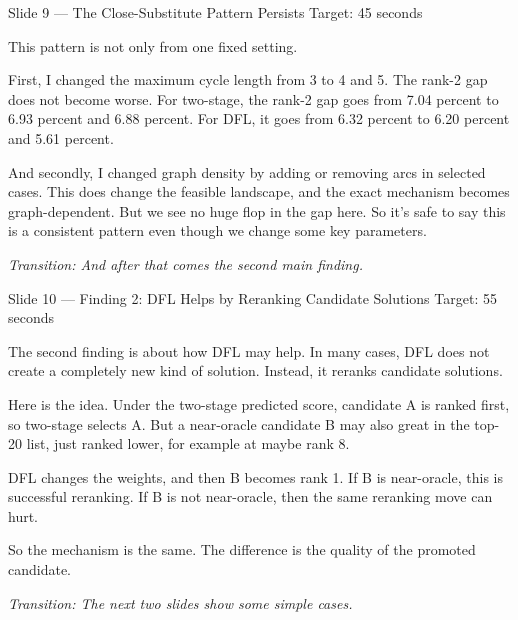 \documentclass[11pt,aspectratio=169]{beamer}
\newcommand{\tr}[1]{\vspace{0.35em}\textit{\textcolor{black!55}{Transition: #1}}}
\newcommand{\timing}[1]{\textcolor{black!45}{\scriptsize Target: #1}\par\vspace{0.25em}}
\begin{document}
\begin{frame}{Slide 9 \enspace\textmd{\small\textcolor{black!40}{--- The Close-Substitute Pattern Persists}}}
\small
\timing{45 seconds}

This pattern is not only from one fixed setting.

\vspace{0.35em}
First, I changed the maximum cycle length from 3 to 4 and 5. The rank-2 gap does not become worse. For two-stage, the rank-2 gap goes from 7.04 percent to 6.93 percent and 6.88 percent. For DFL, it goes from 6.32 percent to 6.20 percent and 5.61 percent.

\vspace{0.35em}
And secondly, I changed graph density by adding or removing arcs in selected cases. This does change the feasible landscape, and the exact mechanism becomes graph-dependent. But we see no huge flop in the gap here.
\vspace{0.35em}
So it's safe to say this is a consistent pattern even though we change some key parameters.

\tr{And after that comes the second main finding.}
\end{frame}

\begin{frame}{Slide 10 \enspace\textmd{\small\textcolor{black!40}{--- Finding 2: DFL Helps by Reranking Candidate Solutions}}}
\small
\timing{55 seconds}

The second finding is about how DFL may help. In many cases, DFL does not create a completely new kind of solution. Instead, it reranks candidate solutions.

\vspace{0.35em}
Here is the idea. Under the two-stage predicted score, candidate A is ranked first, so two-stage selects A. But a near-oracle candidate B may also great in the top-20 list, just ranked lower, for example at maybe rank 8.

\vspace{0.35em}
DFL changes the weights, and then B becomes rank 1. If B is near-oracle, this is successful reranking. If B is not near-oracle, then the same reranking move can hurt.

\vspace{0.35em}
So the mechanism is the same. The difference is the quality of the promoted candidate.

\tr{The next two slides show some simple cases.}
\end{frame}
\end{document}
